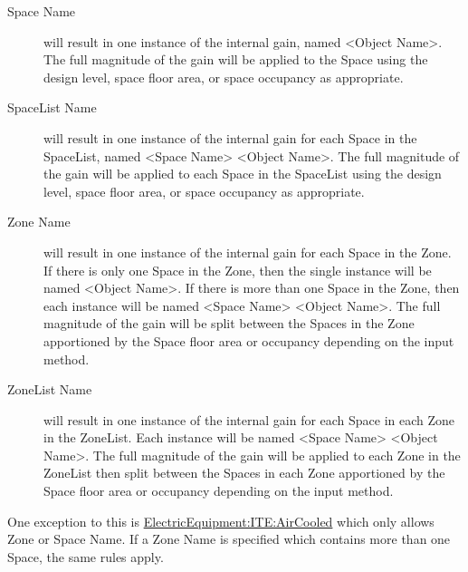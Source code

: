 \begin{description}
  \item[Space Name] will result in one instance of the internal gain, named \textless{}Object Name\textgreater{}. The full magnitude of the gain will be applied to the Space using the design level, space floor area, or space occupancy as appropriate.
  \item[SpaceList Name] will result in one instance of the internal gain for each Space in the SpaceList, named \textless{}Space Name\textgreater{} \textless{}Object Name\textgreater{}. The full magnitude of the gain will be applied to each Space in the SpaceList using the design level, space floor area, or space occupancy as appropriate.
  \item[Zone Name] will result in one instance of the internal gain for each Space in the Zone. If there is only one Space in the Zone, then the single instance will be named \textless{}Object Name\textgreater{}. If there is more than one Space in the Zone, then each instance will be named \textless{}Space Name\textgreater{} \textless{}Object Name\textgreater{}. The full magnitude of the gain will be split between the Spaces in the Zone apportioned by the Space floor area or occupancy depending on the input method.
  \item[ZoneList Name] will result in one instance of the internal gain for each Space in each Zone in the ZoneList. Each instance will be named \textless{}Space Name\textgreater{} \textless{}Object Name\textgreater{}. 
  The full magnitude of the gain will be applied to each Zone in the ZoneList then split between the Spaces in each Zone apportioned by the Space floor area or occupancy depending on the input method.
\end{description}

One exception to this is \hyperref[electricequipmentiteaircooled]{ElectricEquipment:ITE:AirCooled}
which only allows Zone or Space Name. If a Zone Name is specified which contains more than one Space, the same rules apply.

